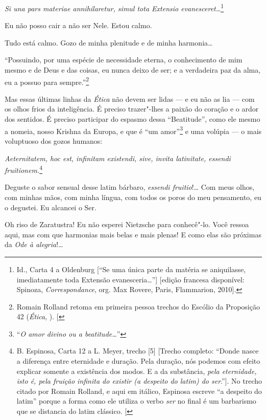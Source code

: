 \emph{Si una pars materiae annihilaretur, simul
tota Extensio evanesceret\ldots{}}\footnote{Id., Carta 4 a Oldenburg {[}``Se
  uma única parte da matéria se aniquilasse, imediatamente toda Extensão
  evanesceria\ldots{}''{]} {[}edição francesa disponível: Spinoza,
  \emph{Correspondance}, org. Max Rovere, Paris,  Flammarion, 2010{]}.}

Eu não posso cair a não ser Nele. Estou calmo.

Tudo está calmo. Gozo de minha plenitude e de minha harmonia\ldots{}

``Possuindo, por uma espécie de necessidade eterna, o conhecimento de
mim mesmo e de Deus e das coisas, eu nunca deixo de ser; e a verdadeira
paz da alma, eu a possuo para sempre.''\footnote{Romain Rolland retoma
  em primeira pessoa trechos do Escólio da Proposição 42 (\emph{Ética},
  ). {[}\versal{N.~T.}{]}}

Mas essas últimas linhas da \emph{Ética} não devem ser lidas --- e eu não
as lia --- com os olhos frios da inteligência. É preciso trazer"-lhes a
paixão do coração e o ardor dos sentidos. É preciso participar do
espasmo dessa ``Beatitude'', como ele mesmo a nomeia, nosso Krishna da
Europa, e que é ``um amor''\footnote{``\emph{O amor divino ou a
  beatitude\ldots{}}''} e uma volúpia --- o mais voluptuoso dos gozos humanos:

\emph{Aeternitatem, hoc est, infinitam existendi, sive, invita
latinitate, essendi fruitionem.}\footnote{B. Espinosa, Carta 12 a L.
  Meyer, trecho {[}5{]} {[}Trecho completo: ``Donde nasce a diferença
  entre eternidade e duração. Pela duração, nós podemos com efeito
  explicar somente a existência dos modos. E a da substância,
  \emph{pela eternidade, isto é, pela fruição infinita do existir (a
  despeito do latim) do ser}.''{]}. No trecho citado por Romain Rolland,
  e aqui em itálico, Espinosa escreve ``a despeito do latim'' porque a
  forma como ele utiliza o verbo \emph{ser} no final é um barbarismo que
  se distancia do latim clássico. {[}\versal{N.~T.}{]}}

Deguste o sabor sensual desse latim bárbaro, \emph{essendi fruitio}!\ldots{}
Com meus olhos, com minhas mãos, com minha língua, com todos os poros do
meu pensamento, eu o degustei. Eu alcancei o Ser.

Oh riso de Zaratustra! Eu não esperei Nietzsche para conhecê"-lo. Você
ressoa aqui, mas com que harmonias mais belas e mais plenas! E como elas
são próximas da \emph{Ode à alegria}!\ldots{}

